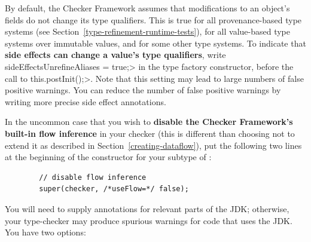 
By default, the Checker Framework assumes that modifications to an object's
fields do not change its type qualifiers.  This is true for all
provenance-based type systems (see
Section~\ref{type-refinement-runtime-tests}), for all value-based type
systems over immutable values, and for some other type systems.  To
indicate that \textbf{side effects can change a value's type qualifiers},
write \<sideEffectsUnrefineAliases = true;> in the type factory
constructor, before the call to \<this.postInit();>.  Note that this
setting may lead to large numbers of false positive warnings.  You can
reduce the number of false positive warnings by writing more precise side
effect annotations.

In the uncommon case that you wish to \textbf{disable the Checker Framework's
built-in flow inference} in your checker (this is different than choosing
not to extend it as described in Section~\ref{creating-dataflow}), put the
following two lines at the beginning of the constructor for your subtype of
:

\begin{Verbatim}
        // disable flow inference
        super(checker, /*useFlow=*/ false);
\end{Verbatim}



You will need to supply annotations for relevant parts of the JDK;
otherwise, your type-checker may produce spurious warnings for code that
uses the JDK\@.  You have two options:

